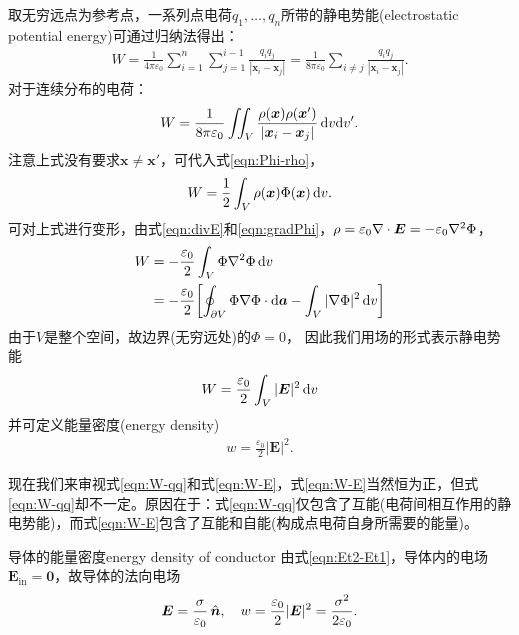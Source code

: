 取无穷远点为参考点，一系列点电荷$q_1,\ldots,q_n$所带的静电势能(electrostatic potential energy)可通过归纳法得出：
\begin{align}
    W=\frac1{4\pi\varepsilon_0}\sum_{i=1}^n\sum_{j=1}^{i-1}\frac{q_iq_j}{|\bm x_i-\bm x_j|}=\frac1{8\pi\varepsilon_0}\sum_{i\neq j}\frac{q_iq_j}{|\bm x_i-\bm x_j|}.
\end{align}
对于连续分布的电荷：
\begin{align*}
    \label{eqn:W-qq}
    W=\frac1{8\pi\varepsilon_0}\iint_V\frac{\rho(\bm x)\rho(\bm x')}{|\bm x_i-\bm x_j|}\mathop{}\!\mathrm{d} v\mathrm{d} v'.
\end{align*}
注意上式没有要求$\bm x\neq\bm x'$，可代入式\eqref{eqn:Phi-rho}，
\begin{align}
    W=\frac12\int_V\rho(\bm x)\Phi(\bm x)\mathop{}\!\mathrm{d} v.
\end{align}
可对上式进行变形，由式\eqref{eqn:divE}和\eqref{eqn:gradPhi}，$\rho=\varepsilon_0\nabla\cdot\bm E=-\varepsilon_0\nabla^2\Phi$，
\begin{align*}
    W&=-\frac{\varepsilon_0}2\int_V\Phi\nabla^2\Phi\mathop{}\!\mathrm{d} v\\
    &=-\frac{\varepsilon_0}2\biggl[\oint_{\partial V}\Phi\nabla\Phi\cdot\mathop{}\!\mathrm{d}\bm a-\int_V|\nabla\Phi|^2\mathop{}\!\mathrm{d} v\biggr]
\end{align*}
由于$V$是整个空间，故边界(无穷远处)的$\Phi=0$，
因此我们用场的形式表示静电势能
\begin{align}
    \label{eqn:W-E}
    W=\frac{\varepsilon_0}2\int_V|\bm E|^2\mathop{}\!\mathrm{d} v
\end{align}
并可定义能量密度(energy density)
\begin{align}
    w=\frac{\varepsilon_0}2|\bm E|^2.
\end{align}

现在我们来审视式\eqref{eqn:W-qq}和式\eqref{eqn:W-E}，式\eqref{eqn:W-E}当然恒为正，但式\eqref{eqn:W-qq}却不一定。原因在于：式\eqref{eqn:W-qq}仅包含了互能(电荷间相互作用的静电势能)，而式\eqref{eqn:W-E}包含了互能和自能(构成点电荷自身所需要的能量)。
\begin{example}{导体的能量密度}{energy density of conductor}
    由式\eqref{eqn:Et2-Et1}，导体内的电场$\bm E_\text{in}=\bm 0$，故导体的法向电场
    \[
        \bm E=\frac\sigma{\varepsilon_0}\mathop{}\!\hat{\bm{n}},\quad w=\frac{\varepsilon_0}2|\bm E|^2=\frac{\sigma^2}{2\varepsilon_0}.
    \]
\end{example}

